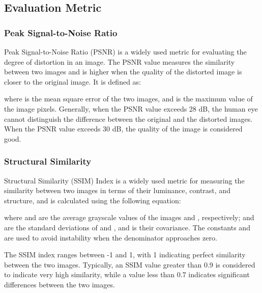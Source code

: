 \documentclass[default,iicol]{sn-jnl}
\theoremstyle{thmstyleone}\newtheorem{theorem}{Theorem}\newtheorem{proposition}[theorem]{Proposition}
\theoremstyle{thmstyletwo}\newtheorem{example}{Example}\newtheorem{remark}{Remark}\theoremstyle{thmstylethree}\newtheorem{definition}{Definition}
\begin{document}
\subsection{Evaluation Metric}
\subsubsection{Peak Signal-to-Noise Ratio}
Peak Signal-to-Noise Ratio (PSNR) is a widely used metric for evaluating the degree of distortion in an image. The PSNR value measures the similarity between two images and is higher when the quality of the distorted image is closer to the original image. It is defined as:


where  is the mean square error of the two images, and  is the maximum value of the image pixels. Generally, when the PSNR value exceeds 28 dB, the human eye cannot distinguish the difference between the original and the distorted images. When the PSNR value exceeds 30 dB, the quality of the image is considered good.

\subsubsection{Structural Similarity}
Structural Similarity (SSIM) Index is a widely used metric for measuring the similarity between two images in terms of their luminance, contrast, and structure, and is calculated using the following equation:


where  and  are the average grayscale values of the images  and , respectively;  and  are the standard deviations of  and , and  is their covariance. The constants  and  are used to avoid instability when the denominator approaches zero.

The SSIM index ranges between -1 and 1, with 1 indicating perfect similarity between the two images. Typically, an SSIM value greater than 0.9 is considered to indicate very high similarity, while a value less than 0.7 indicates significant differences between the two images.
\end{document}
